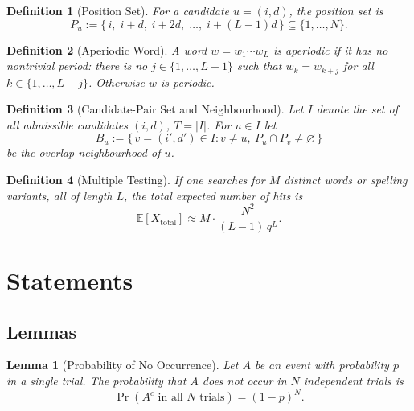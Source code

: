 \documentclass[11pt]{amsart}
\theoremstyle{plain}
\newtheorem{definition}{Definition}
\newtheorem{lemma}{Lemma}
\theoremstyle{remark}
\begin{document}
\begin{definition}[Position Set]
\label{def:positions}
For a candidate \(u = (i,d)\), the \emph{position set} is
\begin{equation}
\label{eq:positions}
P_u := \{\,i,\; i+d,\; i+2d,\; \dots,\; i+(L-1)d\,\} \subseteq \{1,\dots,N\}.
\end{equation}
\end{definition}

\begin{definition}[Aperiodic Word]
\label{def:aperiodic}
A word \(w = w_1 \cdots w_L\) is \emph{aperiodic} if it has no nontrivial
period: there is no \(j \in \{1,\dots,L-1\}\) such that
\(w_k = w_{k+j}\) for all \(k \in \{1,\dots,L-j\}\). Otherwise \(w\) is
\emph{periodic}.
\end{definition}

\begin{definition}[Candidate-Pair Set and Neighbourhood]
\label{def:candidates}
Let \(I\) denote the set of all admissible candidates \((i,d)\),
\(T=|I|\). For \(u\in I\) let
\begin{equation}
\label{eq:Bu-def}
B_u := \{\,v=(i',d')\in I : v\neq u,\ P_u\cap P_v \neq \varnothing\,\}
\end{equation}
be the \emph{overlap neighbourhood} of \(u\).
\end{definition}

\begin{definition}[Multiple Testing]
\label{def:mult}
If one searches for \(M\) distinct words or spelling variants, all of
length \(L\), the total expected number of hits is
\begin{equation}
\label{eq:mult-test}
\mathbb{E}[X_{\text{total}}] \approx M \cdot \frac{N^{2}}{(L-1)\,q^{L}}.
\end{equation}
\end{definition}

\section{Statements}

\subsection{Lemmas}

\begin{lemma}[Probability of No Occurrence]
\label{lem:noocc}
Let \(A\) be an event with probability \(p\) in a single trial. The
probability that \(A\) does not occur in \(N\) independent trials is
\begin{equation}
\label{eq:no-occ}
\Pr(A^c \text{ in all } N \text{ trials}) = (1-p)^N.
\end{equation}
\end{lemma}
\end{document}
